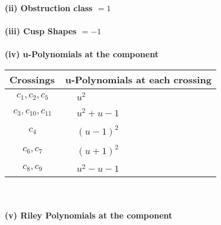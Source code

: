 \documentclass[1p]{elsarticle_modified}
\theoremstyle{definition}
\begin{document}
\flushleft \textbf{(ii) Obstruction class $= 1$}\\~\\
\flushleft \textbf{(iii) Cusp Shapes $= -1$}\\~\\
\newpage\renewcommand{\arraystretch}{1}
\flushleft \textbf{(iv) u-Polynomials at the component}\newline \\
\begin{tabular}{m{50pt}|m{274pt}}
Crossings & \hspace{64pt}u-Polynomials at each crossing \\
\hline $$\begin{aligned}c_{1},c_{2},c_{5}\end{aligned}$$&$\begin{aligned}
&u^2
\end{aligned}$\\
\hline $$\begin{aligned}c_{3},c_{10},c_{11}\end{aligned}$$&$\begin{aligned}
&u^2+u-1
\end{aligned}$\\
\hline $$\begin{aligned}c_{4}\end{aligned}$$&$\begin{aligned}
&(u-1)^2
\end{aligned}$\\
\hline $$\begin{aligned}c_{6},c_{7}\end{aligned}$$&$\begin{aligned}
&(u+1)^2
\end{aligned}$\\
\hline $$\begin{aligned}c_{8},c_{9}\end{aligned}$$&$\begin{aligned}
&u^2- u-1
\end{aligned}$\\
\hline
\end{tabular}\\~\\
\newpage\renewcommand{\arraystretch}{1}
\flushleft \textbf{(v) Riley Polynomials at the component}\newline \\
\end{document}
